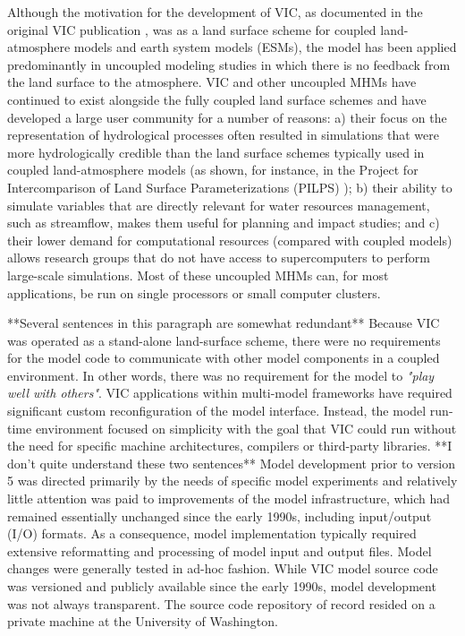 \documentclass[gmd, manuscript]{copernicus}
\begin{document}
  Although the motivation for the development of VIC, as documented in the original VIC publication \citep{Liang_1994}, was as a land surface scheme for coupled land-atmosphere models and earth system models (ESMs), the model has been applied predominantly in uncoupled modeling studies in which there is no feedback from the land surface to the atmosphere. VIC and other uncoupled MHMs have continued to exist alongside the fully coupled land surface schemes and have developed a large user community for a number of reasons: a) their focus on the representation of hydrological processes often resulted in simulations that were more hydrologically credible than the land surface schemes typically used in coupled land-atmosphere models (as shown, for instance, in the Project for Intercomparison of Land Surface Parameterizations (PILPS) \citep{Bowling_2003,wood_1998}); b) their ability to simulate variables that are directly relevant for water resources management, such as streamflow, makes them useful for planning and impact studies; and c) their lower demand for computational resources (compared with coupled models) allows research groups that do not have access to supercomputers to perform large-scale simulations. Most of these uncoupled MHMs can, for most applications, be run on single processors or small computer clusters.

  **Several sentences in this paragraph are somewhat redundant** Because VIC was operated as a stand-alone land-surface scheme, there were no requirements for the model code to communicate with other model components in a coupled environment. In other words, there was no requirement for the model to \textit{"play well with others"}. {VIC applications within multi-model frameworks \citep[e.g. NASA LIS, ][]{Kumar_2006} have  required significant custom reconfiguration of the model interface. Instead, the model run-time environment focused on simplicity with the goal that VIC could run without the need for specific machine architectures, compilers or third-party libraries.} **I don't quite understand these two sentences** Model development prior to version 5 was directed primarily by the needs of specific model experiments and relatively little attention was paid to improvements of the model infrastructure, which had remained essentially unchanged since the early 1990s, including input/output (I/O) formats. As a consequence, model implementation typically required extensive reformatting and processing of model input and output files. Model changes were generally tested in ad-hoc fashion. While VIC model source code was versioned and publicly available since the early 1990s, model development was not always transparent. The source code repository of record resided on a private machine at the University of Washington.
\end{document}
